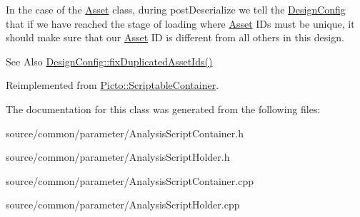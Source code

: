 In the case of the \hyperlink{class_picto_1_1_asset}{Asset} class, during post\-Deserialize we tell the \hyperlink{class_picto_1_1_design_config}{Design\-Config} that if we have reached the stage of loading where \hyperlink{class_picto_1_1_asset}{Asset} I\-Ds must be unique, it should make sure that our \hyperlink{class_picto_1_1_asset}{Asset} I\-D is different from all others in this design. \begin{DoxySeeAlso}{See Also}
\hyperlink{class_picto_1_1_design_config_ab57e0738b97e4358ab09530cd6815fc0}{Design\-Config\-::fix\-Duplicated\-Asset\-Ids()} 
\end{DoxySeeAlso}


Reimplemented from \hyperlink{class_picto_1_1_scriptable_container_a0654af2c08f9a6c967a21b57614950ba}{Picto\-::\-Scriptable\-Container}.



The documentation for this class was generated from the following files\-:\begin{DoxyCompactItemize}
\item 
source/common/parameter/Analysis\-Script\-Container.\-h\item 
source/common/parameter/Analysis\-Script\-Holder.\-h\item 
source/common/parameter/Analysis\-Script\-Container.\-cpp\item 
source/common/parameter/Analysis\-Script\-Holder.\-cpp\end{DoxyCompactItemize}
